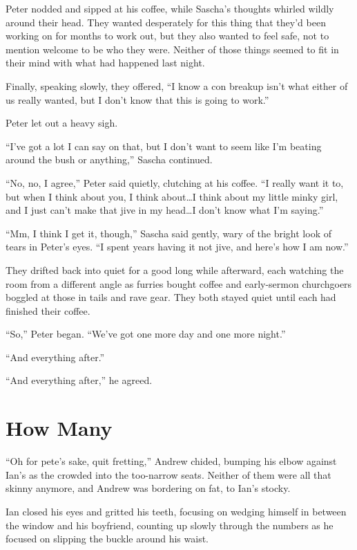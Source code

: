 \documentclass[12pt,letterpaper,oneside]{memoir}
\begin{document}
  Peter nodded and sipped at his coffee, while Sascha's thoughts whirled wildly around their head. They wanted desperately for this thing that they'd been working on for months to work out, but they also wanted to feel safe, not to mention welcome to be who they were. Neither of those things seemed to fit in their mind with what had happened last night.

  Finally, speaking slowly, they offered, ``I know a con breakup isn't what either of us really wanted, but I don't know that this is going to work.''

  Peter let out a heavy sigh.

  ``I've got a lot I can say on that, but I don't want to seem like I'm beating around the bush or anything,'' Sascha continued.

  ``No, no, I agree,'' Peter said quietly, clutching at his coffee. ``I really want it to, but when I think about you, I think about\ldots{}I think about my little minky girl, and I just can't make that jive in my head\ldots{}I don't know what I'm saying.''

  ``Mm, I think I get it, though,'' Sascha said gently, wary of the bright look of tears in Peter's eyes. ``I spent years having it not jive, and here's how I am now.''

  They drifted back into quiet for a good long while afterward, each watching the room from a different angle as furries bought coffee and early-sermon churchgoers boggled at those in tails and rave gear. They both stayed quiet until each had finished their coffee.

  ``So,'' Peter began. ``We've got one more day and one more night.''

  ``And everything after.''

  ``And everything after,'' he agreed.

  \chapter{How Many}

  ``Oh for pete's sake, quit fretting,'' Andrew chided, bumping his elbow against Ian's as the crowded into the too-narrow seats. Neither of them were all that skinny anymore, and Andrew was bordering on fat, to Ian's stocky.

  Ian closed his eyes and gritted his teeth, focusing on wedging himself in between the window and his boyfriend, counting up slowly through the numbers as he focused on slipping the buckle around his waist.
\end{document}
